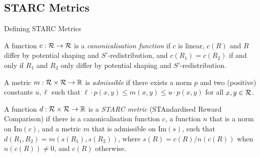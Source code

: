 \documentclass{beamer}
\begin{document}

\subsection{STARC Metrics}


\begin{frame}{Defining STARC Metrics}
    \small
    \begin{definition}\label{def:canonicalisation_function}
    A function $c : \mathcal{R} \to \mathcal{R}$ is a \emph{canonicalisation function} if $c$ is linear, $c(R)$ and $R$ differ by potential shaping and $S'$-redistribution, and $c(R_1) = c(R_2)$ if and only if $R_1$ and $R_2$ only differ by potential shaping and $S'$-redistribution.
    \end{definition}
    
    \begin{definition}\label{def:admissible_metric}
    A metric $m : \mathcal{R} \times \mathcal{R} \to \mathbb{R}$ is \emph{admissible} if there exists a norm $p$ and two (positive) constants $u,\ell$ such that $\ell \cdot p(x,y) \leq m(x,y) \leq u \cdot p (x,y)$ for all $x, y \in \mathcal{R}$.
    \end{definition}
    
    \begin{definition}\label{def:reward_metric}
    A function $d : \mathcal{R} \times \mathcal{R} \to \mathbb{R}$ is a \emph{STARC metric} (STAndardised Reward Comparison) if there is a canonicalisation function $c$, a function $n$ that is a norm on $\mathrm{Im}(c)$, and a metric $m$ that is admissible on $\mathrm{Im}(s)$, such that $d(R_1, R_2) = m(s(R_1), s(R_2))$,
    where $s(R) = c(R)/n(c(R))$ when $n(c(R)) \neq 0$, and $c(R)$ otherwise.
    \end{definition}
\end{frame}
\end{document}

